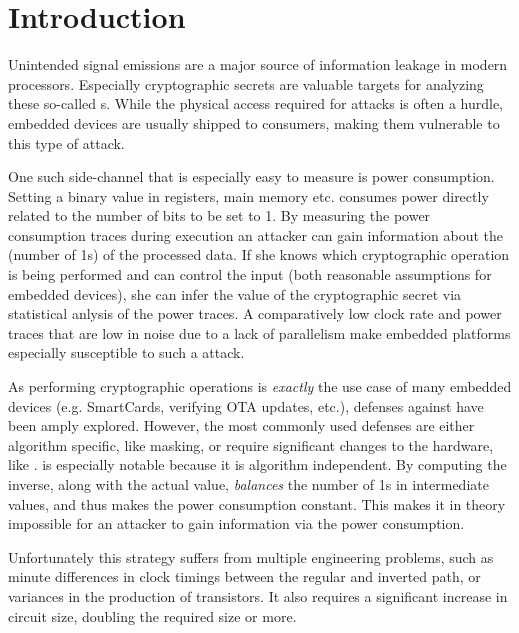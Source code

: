 \section{Introduction}
Unintended signal emissions are a major source of information leakage in modern processors.
Especially cryptographic secrets are valuable targets for analyzing these so-called \sidechannel{}s.
While the physical access required for \sidechannel{} attacks is often a hurdle, embedded devices are usually shipped to consumers, making them vulnerable to this type of attack.

One such side-channel that is especially easy to measure is power consumption.
Setting a binary value in registers, main memory etc. consumes power directly related to the number of bits to be set to 1.
By measuring the power consumption traces during execution an attacker can gain information about the \hammingw{} (number of 1s) of the processed data.
If she knows which cryptographic operation is being performed and can control the input (both reasonable assumptions for embedded devices), she can infer the value of the cryptographic secret via statistical anlysis of the power traces.\cite{brier2004correlation}
A comparatively low clock rate and power traces that are low in noise due to a lack of parallelism make embedded platforms especially susceptible to such a \poweranalysis{} attack.

As performing cryptographic operations is \emph{exactly} the use case of many embedded devices (e.g. SmartCards, verifying OTA updates, etc.), defenses against \poweranalysis{} have been amply explored.
However, the most commonly used defenses are either algorithm specific, like masking, or require significant changes to the hardware, like \dual{}\cite{sokolov2005design}.
\dual{} is especially notable because it is algorithm independent.
By computing the inverse, along with the actual value, \dual{} \emph{balances} the number of 1s in intermediate values, and thus makes the power consumption constant.
This makes it in theory impossible for an attacker to gain information via the power consumption.

Unfortunately this strategy suffers from multiple engineering problems, such as minute differences in clock timings between the regular and inverted path\cite{baddam2008path}, or variances in the production of transistors\cite{razafindraibe2006formal}.
It also requires a significant increase in circuit size, doubling the required size or more\cite{baddam2008path}.

